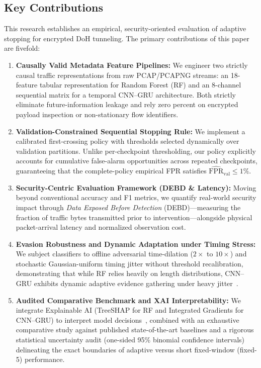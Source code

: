 \documentclass[conference]{IEEEtran}
\begin{document}
\subsection{Key Contributions}
This research establishes an empirical, security-oriented evaluation of adaptive stopping for encrypted DoH tunneling. The primary contributions of this paper are fivefold:
\begin{enumerate}
    \item \textbf{Causally Valid Metadata Feature Pipelines:} We engineer two strictly causal traffic representations from raw PCAP/PCAPNG streams: an 18-feature tabular representation for Random Forest (RF) and an 8-channel sequential matrix for a temporal CNN--GRU architecture. Both strictly eliminate future-information leakage and rely zero percent on encrypted payload inspection or non-stationary flow identifiers.
    \item \textbf{Validation-Constrained Sequential Stopping Rule:} We implement a calibrated first-crossing policy with thresholds selected dynamically over validation partitions. Unlike per-checkpoint thresholding, our policy explicitly accounts for cumulative false-alarm opportunities across repeated checkpoints, guaranteeing that the complete-policy empirical FPR satisfies $\widehat{\mathrm{FPR}}_{\mathrm{val}} \le 1\%$.
    \item \textbf{Security-Centric Evaluation Framework (DEBD \& Latency):} Moving beyond conventional accuracy and F1 metrics, we quantify real-world security impact through \emph{Data Exposed Before Detection} (DEBD)---measuring the fraction of traffic bytes transmitted prior to intervention---alongside physical packet-arrival latency and normalized observation cost.
    \item \textbf{Evasion Robustness and Dynamic Adaptation under Timing Stress:} We subject classifiers to offline adversarial time-dilation ($2\times$ to $10\times$) and stochastic Gaussian-uniform timing jitter without threshold recalibration, demonstrating that while RF relies heavily on length distributions, CNN--GRU exhibits dynamic adaptive evidence gathering under heavy jitter~\cite{wu2024,li2025}.
    \item \textbf{Audited Comparative Benchmark and XAI Interpretability:} We integrate Explainable AI (TreeSHAP for RF and Integrated Gradients for CNN--GRU) to interpret model decisions~\cite{niktabe2024,zebin2022}, combined with an exhaustive comparative study against published state-of-the-art baselines and a rigorous statistical uncertainty audit (one-sided 95\% binomial confidence intervals) delineating the exact boundaries of adaptive versus short fixed-window (fixed-5) performance.
\end{enumerate}
\end{document}
